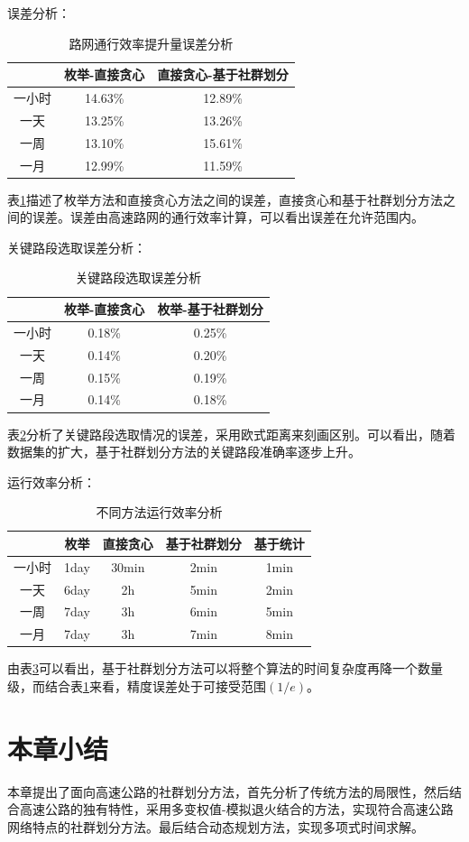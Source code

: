 		误差分析：

				\begin{table}[h]
				\centering
				\begin{tabular}{|c|c|c|}
				\hline
				\hline
				  &  枚举-直接贪心 &  直接贪心-基于社群划分 \\
				\hline
				 一小时 &  14.63\% &  12.89\% \\
				\hline
				 一天 &  13.25\% &  13.26\% \\
				\hline
				 一周 &  13.10\% &  15.61\% \\
				\hline
				 一月 &  12.99\% &  11.59\% \\
				\hline
				\end{tabular}
				\caption{路网通行效率提升量误差分析}
				\label{table1}
				\end{table} 

		表\ref{table1}描述了枚举方法和直接贪心方法之间的误差，直接贪心和基于社群划分方法之间的误差。误差由高速路网的通行效率计算，可以看出误差在允许范围内。

		关键路段选取误差分析：

				\begin{table}[h]
				\centering
				\begin{tabular}{|c|c|c|}
				\hline
				\hline
				   &   枚举-直接贪心 &   枚举-基于社群划分 \\
				\hline
				  一小时 &   0.18\% &   0.25\% \\
				\hline
				  一天 &   0.14\% &   0.20\% \\
				\hline
				  一周 &   0.15\% &   0.19\% \\
				\hline
				  一月 &   0.14\% &   0.18\% \\
				\hline
				\end{tabular}
				\caption{关键路段选取误差分析}
				\label{table2}
				\end{table} 

		表\ref{table2}分析了关键路段选取情况的误差，采用欧式距离来刻画区别。可以看出，随着数据集的扩大，基于社群划分方法的关键路段准确率逐步上升。

		运行效率分析：

				\begin{table}[h]
				\centering
				\begin{tabular}{|c|c|c|c|c|}
				\hline
				\hline
				   &   枚举 &   直接贪心 &   基于社群划分 &   基于统计 \\
				\hline
				  一小时 &   1day &   30min &   2min &   1min \\
				\hline
				  一天 &   6day &   2h &   5min &   2min \\
				\hline
				  一周 &  7day &   3h &   6min &   5min \\
				\hline
				  一月 &   7day &   3h &   7min &   8min \\
				\hline
				\end{tabular}
				\caption{不同方法运行效率分析}
				\label{table3}
				\end{table} 

		由表\ref{table3}可以看出，基于社群划分方法可以将整个算法的时间复杂度再降一个数量级，而结合表\ref{table1}来看，精度误差处于可接受范围$(1/e)$。

	\section{本章小结}
		本章提出了面向高速公路的社群划分方法，首先分析了传统方法的局限性，然后结合高速公路的独有特性，采用多变权值-模拟退火结合的方法，实现符合高速公路网络特点的社群划分方法。最后结合动态规划方法，实现多项式时间求解。